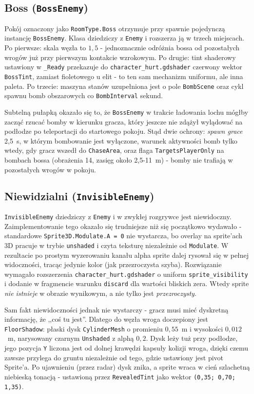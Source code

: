 \subsection{Boss (\texttt{BossEnemy})}

Pokój oznaczony jako \texttt{RoomType.Boss} otrzymuje przy spawnie pojedynczą instancję \texttt{BossEnemy}. Klasa dziedziczy z \texttt{Enemy} i rozszerza ją w trzech miejscach. Po pierwsze: skala węzła to $1{,}5$ - jednoznacznie odróżnia bossa od pozostałych wrogów już przy pierwszym kontakcie wzrokowym. Po drugie: tint shaderowy ustawiony w \texttt{\_Ready} przekazuje do \texttt{character\_hurt.gdshader} czerwony wektor \texttt{BossTint}, zamiast fioletowego u elit - to ten sam mechanizm uniformu, ale inna paleta. Po trzecie: maszyna stanów uzupełniona jest o pole \texttt{BombScene} oraz cykl spawnu bomb obszarowych co \texttt{BombInterval} sekund.

Subtelną pułapką okazało się to, że \texttt{BossEnemy} w trakcie ładowania lochu mógłby zacząć rzucać bomby w kierunku gracza, który jeszcze nie zdążył wylądować na podłodze po teleportacji do startowego pokoju. Stąd dwie ochrony: \emph{spawn grace} 2,5~s, w którym bombowanie jest wyłączone, warunek aktywności bomb tylko wtedy, gdy gracz wszedł do \texttt{ChaseArea}, oraz flaga \texttt{TargetsPlayerOnly} na bombach bossa (obrażenia 14, zasięg około 2,5-11~m) - bomby nie trafiają w pozostałych wrogów w pokoju.

\subsection{Niewidzialni (\texttt{InvisibleEnemy})}

\texttt{InvisibleEnemy} dziedziczy z \texttt{Enemy} i w zwykłej rozgrywce jest niewidoczny. Zaimplementowanie tego okazało się trudniejsze niż się początkowo wydawało - standardowe \texttt{Sprite3D.Modulate.A = 0} nie wystarcza, bo overlay na sprite'ach 3D pracuje w trybie \texttt{unshaded} i czyta teksturę niezależnie od \texttt{Modulate}. W rezultacie po prostym wyzerowaniu kanału alpha sprite dalej rysował się w pełnej widoczności, tracąc jedynie kolor (jak przezroczysta szyba). Rozwiązanie wymagało rozszerzenia \texttt{character\_hurt.gdshader} o uniform \texttt{sprite\_visibility} i dodanie w fragmencie warunku \texttt{discard} dla wartości bliskich zera. Wtedy sprite \emph{nie istnieje} w obrazie wynikowym, a nie tylko jest \emph{przezroczysty}.

Sam fakt niewidoczności jednak nie wystarczy - gracz musi mieć dyskretną informację, że ,,coś tu jest''. Dlatego do węzła wroga doczepiony jest \texttt{FloorShadow}: płaski dysk \texttt{CylinderMesh} o promieniu $0{,}55$~m i wysokości $0{,}012$~m, narysowany czarnym \texttt{Unshaded} z alphą $0{,}2$. Dysk leży tuż przy podłodze, jego pozycja \texttt{Y} liczona jest od dolnej krawędzi kapsuły kolizji wroga, dzięki czemu zawsze przylega do gruntu niezależnie od tego, gdzie ustawiony jest pivot Sprite'a. Po ujawnieniu (przez radar) dysk znika, a sprite wraca w cień szlachetną niebieską tonacją - ustawioną przez \texttt{RevealedTint} jako wektor \texttt{(0,35; 0,70; 1,35)}.

